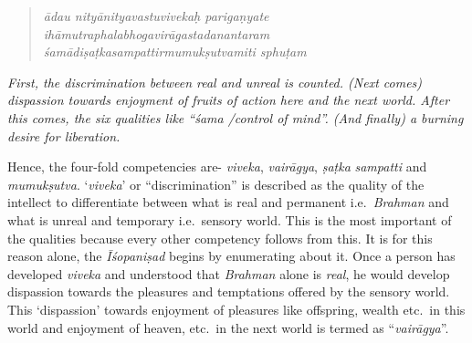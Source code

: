 \begin{verse}
\emph{ādau nityānityavastuvivekaḥ parigaṇyate }\\
\emph{ihāmutraphalabhogavirāgastadanantaram }\\
\emph{śamādiṣaṭkasampattirmumukṣutvamiti sphuṭam }
\end{verse}

\emph{First, the discrimination between real and unreal is counted. (Next comes) dispassion towards enjoyment of fruits of action here and the next world. After this comes, the six qualities like ``śama /control of mind''. (And finally) a burning desire for liberation.}

Hence, the four-fold competencies are- \emph{viveka}, \emph{vairāgya}, \emph{ṣaṭka} \emph{sampatti} and \emph{mumukṣutva}. `\emph{viveka}' or ``discrimination'' is described as the quality of the intellect to differentiate between what is real and permanent i.e.\ \emph{Brahman} and what is unreal and temporary i.e.\ sensory world. This is the most important of the qualities because every other competency follows from this. It is for this reason alone, the \emph{Īśopaniṣad} begins by enumerating about it. Once a person has developed \emph{viveka} and understood that \emph{Brahman} alone is \emph{real}, he would develop dispassion towards the pleasures and temptations offered by the sensory world. This `dispassion' towards enjoyment of pleasures like offspring, wealth etc.\ in this world and enjoyment of heaven, etc.\ in the next world is termed as ``\emph{vairāgya}''.

